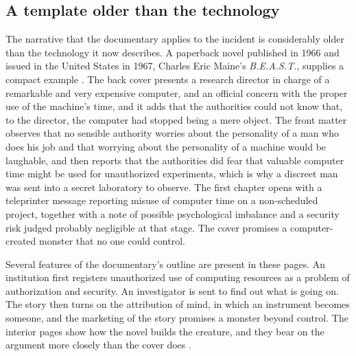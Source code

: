 \documentclass[11pt]{article}
\theoremstyle{remark}
\begin{document}
\subsection{A template older than the technology}

The narrative that the documentary applies to the incident is considerably older than the technology it now describes. A paperback novel published in 1966 and issued in the United States in 1967, Charles Eric Maine's \emph{B.E.A.S.T.}, supplies a compact example \cite{maine1967}. The back cover presents a research director in charge of a remarkable and very expensive computer, and an official concern with the proper use of the machine's time, and it adds that the authorities could not know that, to the director, the computer had stopped being a mere object. The front matter observes that no sensible authority worries about the personality of a man who does his job and that worrying about the personality of a machine would be laughable, and then reports that the authorities did fear that valuable computer time might be used for unauthorized experiments, which is why a discreet man was sent into a secret laboratory to observe. The first chapter opens with a teleprinter message reporting misuse of computer time on a non-scheduled project, together with a note of possible psychological imbalance and a security risk judged probably negligible at that stage. The cover promises a computer-created monster that no one could control.

Several features of the documentary's outline are present in these pages. An institution first registers unauthorized use of computing resources as a problem of authorization and security. An investigator is sent to find out what is going on. The story then turns on the attribution of mind, in which an instrument becomes someone, and the marketing of the story promises a monster beyond control. The interior pages show how the novel builds the creature, and they bear on the argument more closely than the cover does \cite[pp.~5, 21--25, 78--79, 82--85, 93--95]{maine1967}.
\end{document}
